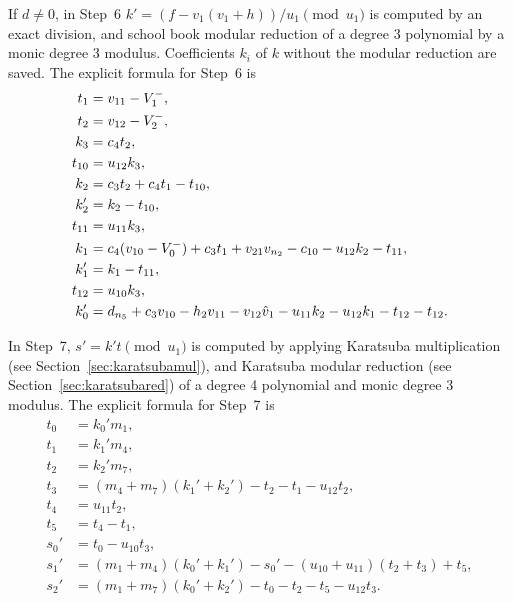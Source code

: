 If $d \neq 0$, in Step~6  $k' = (f - v_1(v_1 + h))/u_1 \pmod{u_1}$ is computed
by an exact division, and school book modular reduction of a degree 3 polynomial
by a monic degree 3 modulus. Coefficients $k_i$ of $k$ without the modular
reduction are saved. The explicit formula for Step~6 is \newpage
\begin{align*}
    t_1  &= v_{11} - V^{-}_1,\\
    t_2  &= v_{12} - V^{-}_2,\\
    k_3  &= c_4t_2,\\
    t_{10} &= u_{12}k_3,\\
    k_2  &= c_3t_2 + c_4t_1 - t_{10},\\
    k_2' &= k_2 - t_{10},\\
    t_{11} &= u_{11}k_3,\\
    k_1  &= c_4(v_{10} - V^{-}_0) + c_3t_1 + v_{21}v_{n_2} - c_{10} - u_{12}k_2 - t_{11},\\
    k_1' &= k_1 - t_{11},\\
    t_{12} &= u_{10}k_3,\\
    k_0'  &= d_{n_5} + c_3v_{10} - h_2v_{11} - v_{12}\hat{v}_1 - u_{11}k_2 - u_{12}k_1 - t_{12} - t_{12}.
\end{align*}

In Step~7, $s' = k't \pmod{u_1}$ is computed by applying Karatsuba
multiplication (see Section~\ref{sec:karatsubamul}), and Karatsuba modular
reduction (see Section~\ref{sec:karatsubared}) of a degree 4 polynomial and
monic degree 3 modulus. The explicit formula for Step~7 is
\begin{align*}
    t_0 &= k_0'm_1,\\
    t_1 &= k_1'm_4,\\
    t_2 &= k_2'm_7,\\
    t_3 &= (m_4 + m_7)(k_1' + k_2') - t_2 - t_1 - u_{12}t_2,\\
    t_4 &= u_{11}t_2,\\
    t_5 &= t_4 - t_1,\\
    s_0' &= t_0 - u_{10}t_3,\\
    s_1' &= (m_1 + m_4)(k_0' + k_1') - s_0' - (u_{10} + u_{11})(t_2 + t_3) + t_5,\\
    s_2' &= (m_1 + m_7)(k_0' + k_2') - t_0 - t_2 - t_5 - u_{12}t_3.
\end{align*}

